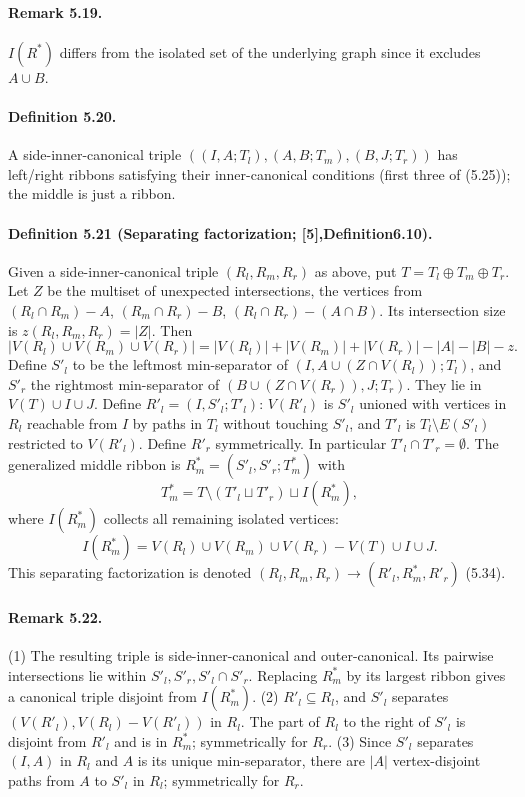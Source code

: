 \paragraph{Remark 5.19.} $I(R^*)$ differs from the isolated set of the underlying graph since it excludes $A\cup B$.
\paragraph{Definition 5.20.} A side-inner-canonical triple $((I,A;T_l),(A,B;T_m),(B,J;T_r))$ has left/right ribbons satisfying their inner-canonical conditions (first three of (5.25)); the middle is just a ribbon.
\paragraph{Definition 5.21 (Separating factorization; [5],Definition6.10).} Given a side-inner-canonical triple $(R_l,R_m,R_r)$ as above, put $T=T_l\oplus T_m\oplus T_r$. Let $Z$ be the multiset of unexpected intersections, the vertices from $(R_l\cap R_m)-A$, $(R_m\cap R_r)-B$, $(R_l\cap R_r)-(A\cap B)$. Its intersection size is $z(R_l,R_m,R_r)=|Z|$. Then
\[|V(R_l)\cup V(R_m)\cup V(R_r)|=|V(R_l)|+|V(R_m)|+|V(R_r)|-|A|-|B|-z.\tag{5.32}\]
Define $S'_l$ to be the leftmost min-separator of $(I,A\cup(Z\cap V(R_l));T_l)$, and $S'_r$ the rightmost min-separator of $(B\cup(Z\cap V(R_r)),J;T_r)$. They lie in $V(T)\cup I\cup J$. Define $R'_l=(I,S'_l;T'_l)$: $V(R'_l)$ is $S'_l$ unioned with vertices in $R_l$ reachable from $I$ by paths in $T_l$ without touching $S'_l$, and $T'_l$ is $T_l\setminus E(S'_l)$ restricted to $V(R'_l)$. Define $R'_r$ symmetrically. In particular $T'_l\cap T'_r=\emptyset$. The generalized middle ribbon is $R^*_m=(S'_l,S'_r;T^*_m)$ with
\[T^*_m=T\setminus(T'_l\sqcup T'_r)\sqcup I(R^*_m),\]
where $I(R^*_m)$ collects all remaining isolated vertices:
\[I(R^*_m)=V(R_l)\cup V(R_m)\cup V(R_r)-V(T)\cup I\cup J.\tag{5.33}\]
This separating factorization is denoted $(R_l,R_m,R_r)\to(R'_l,R^*_m,R'_r)$ (5.34).
\paragraph{Remark 5.22.} (1) The resulting triple is side-inner-canonical and outer-canonical. Its pairwise intersections lie within $S'_l,S'_r,S'_l\cap S'_r$. Replacing $R^*_m$ by its largest ribbon gives a canonical triple disjoint from $I(R^*_m)$. (2) $R'_l\subseteq R_l$, and $S'_l$ separates $(V(R'_l),V(R_l)-V(R'_l))$ in $R_l$. The part of $R_l$ to the right of $S'_l$ is disjoint from $R'_l$ and is in $R^*_m$; symmetrically for $R_r$. (3) Since $S'_l$ separates $(I,A)$ in $R_l$ and $A$ is its unique min-separator, there are $|A|$ vertex-disjoint paths from $A$ to $S'_l$ in $R_l$; symmetrically for $R_r$.
